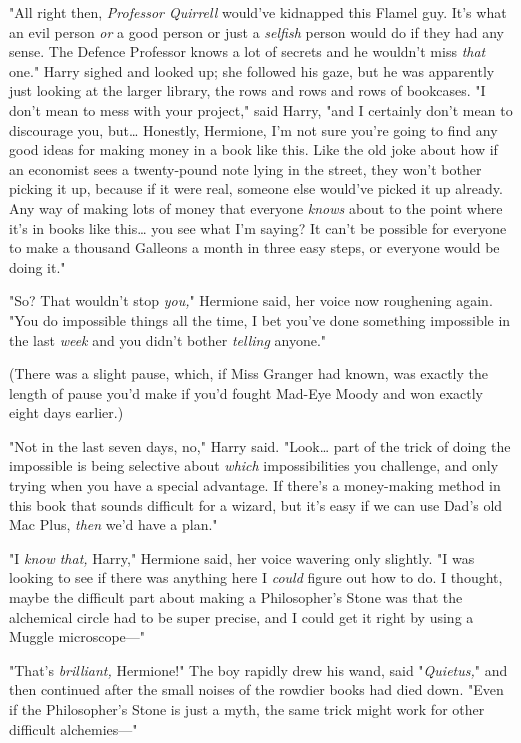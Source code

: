 "All right then, \emph{Professor Quirrell} would've kidnapped this Flamel guy.
It's what an evil person \emph{or} a good person or just a \emph{selfish}
person would do if they had any sense. The Defence Professor knows a lot of
secrets and he wouldn't miss \emph{that} one." Harry sighed and looked up; she
followed his gaze, but he was apparently just looking at the larger library,
the rows and rows and rows of bookcases. "I don't mean to mess with your
project," said Harry, "and I certainly don't mean to discourage you,
but{\ldots} Honestly, Hermione, I'm not sure you're going to find any good
ideas for making money in a book like this. Like the old joke about how if an
economist sees a twenty-pound note lying in the street, they won't bother
picking it up, because if it were real, someone else would've picked it up
already. Any way of making lots of money that everyone \emph{knows} about to
the point where it's in books like this{\ldots} you see what I'm saying? It
can't be possible for everyone to make a thousand Galleons a month in three
easy steps, or everyone would be doing it."

"So? That wouldn't stop \emph{you,}" Hermione said, her voice now roughening
again. "You do impossible things all the time, I bet you've done something
impossible in the last \emph{week} and you didn't bother \emph{telling} anyone."

(There was a slight pause, which, if Miss Granger had known, was exactly the
length of pause you'd make if you'd fought Mad-Eye Moody and won exactly eight
days earlier.)

"Not in the last seven days, no," Harry said. "Look{\ldots} part of the trick
of doing the impossible is being selective about \emph{which} impossibilities
you challenge, and only trying when you have a special advantage. If there's a
money-making method in this book that sounds difficult for a wizard, but it's
easy if we can use Dad's old Mac Plus, \emph{then} we'd have a plan."

"I \emph{know that,} Harry," Hermione said, her voice wavering only slightly.
"I was looking to see if there was anything here I \emph{could} figure out how
to do. I thought, maybe the difficult part about making a Philosopher's Stone
was that the alchemical circle had to be super precise, and I could get it
right by using a Muggle microscope---"

"That's \emph{brilliant,} Hermione!" The boy rapidly drew his wand, said
"\emph{Quietus,}" and then continued after the small noises of the rowdier
books had died down. "Even if the Philosopher's Stone is just a myth, the same
trick might work for other difficult alchemies---"


